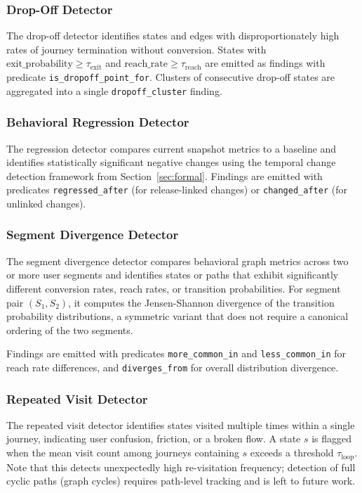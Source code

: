 \documentclass[12pt, a4paper]{article}
\begin{document}
\subsubsection{Drop-Off Detector}

The drop-off detector identifies states and edges with disproportionately high rates of journey termination without conversion. States with $\text{exit\_probability} \geq \tau_{\text{exit}}$ and $\text{reach\_rate} \geq \tau_{\text{reach}}$ are emitted as findings with predicate \texttt{is\_dropoff\_point\_for}. Clusters of consecutive drop-off states are aggregated into a single \texttt{dropoff\_cluster} finding.

\subsubsection{Behavioral Regression Detector}

The regression detector compares current snapshot metrics to a baseline and identifies statistically significant negative changes using the temporal change detection framework from Section~\ref{sec:formal}. Findings are emitted with predicates \texttt{regressed\_after} (for release-linked changes) or \texttt{changed\_after} (for unlinked changes).

\subsubsection{Segment Divergence Detector}

The segment divergence detector compares behavioral graph metrics across two or more user segments and identifies states or paths that exhibit significantly different conversion rates, reach rates, or transition probabilities. For segment pair $(S_1, S_2)$, it computes the Jensen-Shannon divergence of the transition probability distributions, a symmetric variant that does not require a canonical ordering of the two segments.

Findings are emitted with predicates \texttt{more\_common\_in} and \texttt{less\_common\_in} for reach rate differences, and \texttt{diverges\_from} for overall distribution divergence.

\subsubsection{Repeated Visit Detector}

The repeated visit detector identifies states visited multiple times within a single journey, indicating user confusion, friction, or a broken flow. A state $s$ is flagged when the mean visit count among journeys containing $s$ exceeds a threshold $\tau_{\text{loop}}$. Note that this detects unexpectedly high re-visitation frequency; detection of full cyclic paths (graph cycles) requires path-level tracking and is left to future work.
\end{document}
